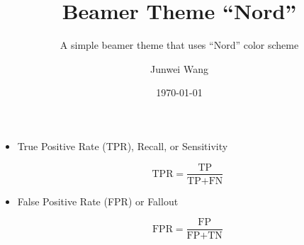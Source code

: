 \documentclass[compress]{beamer}
\title{Beamer Theme ``Nord''}
\subtitle{A simple beamer theme that uses ``Nord'' color scheme}
\author{Junwei Wang}
\institute{CryptoExperts}
\date{\today}
\begin{document}
\begin{frame}

\begin{itemize}

\item \color{NordOrange} True Positive Rate \color{NordWhite}(TPR), \color{NordOrange} Recall\color{NordWhite}, or \color{NordOrange} Sensitivity \color{NordWhite}

\begin{equation*}
\text{TPR} = \displaystyle\frac{\text{TP}}{\text{TP}+\text{FN}}
\end{equation*}

\pause

\vspace{25pt}

\item \color{NordOrange} False Positive Rate \color{NordWhite}(FPR) or \color{NordOrange} Fallout \color{NordWhite}

\begin{equation*}
\text{FPR} = \displaystyle\frac{\text{FP}}{\text{FP}+\text{TN}}
\end{equation*}


\end{itemize}

\end{frame}
\end{document}
